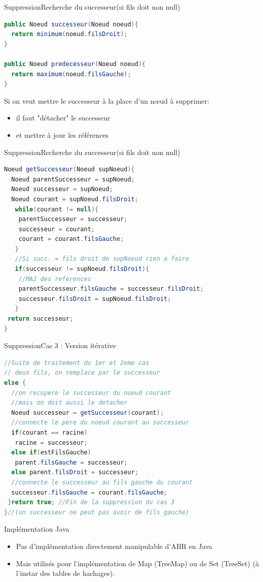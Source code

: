 \documentclass[12pt,a4paper]{beamer}
\newcommand{\hl}[1]{\textcolor{blueemph}{#1}}
\begin{document}
\begin{frame}[fragile]{Suppression}{Recherche du successeur(si fils doit non null)}

\begin{lstlisting}[language=Java]
public Noeud successeur(Noeud noeud){
  return minimum(noeud.filsDroit);
}

public Noeud predecesseur(Noeud noeud){
  return maximum(noeud.filsGauche);
}
\end{lstlisting}
Si on veut mettre le successeur à la place d'un n\oe ud à supprimer:
\begin{itemize}
\item il faut "détacher" le successeur
\item et mettre à jour les références
\end{itemize} 
\end{frame}

\begin{frame}[fragile]{Suppression}{Recherche du successeur(si fils doit non null)}
\begin{lstlisting}[language=Java]
Noeud getSuccesseur(Noeud supNoeud){
  Noeud parentSuccesseur = supNoeud;
  Noeud successeur = supNoeud;
  Noeud courant = supNoeud.filsDroit;
   while(courant != null){
    parentSuccesseur = successeur;
    successeur = courant;
    courant = courant.filsGauche;
   }
   //Si succ. = fils droit de supNoeud rien a faire
   if(successeur != supNoeud.filsDroit){
    //MAJ des references
    parentSuccesseur.filsGauche = successeur.filsDroit;
    successeur.filsDroit = supNoeud.filsDroit;
   }
 return successeur;
}
\end{lstlisting}
\end{frame}

\begin{frame}[fragile]{Suppression}{Cas 3 : Version itérative}
\begin{lstlisting}[language=Java]
//Suite de traitement du 1er et 2eme cas
// deux fils, on remplace par le successeur
else {
  //on recupere le successeur du noeud courant
  //mais on doit aussi le detacher
  Noeud successeur = getSuccesseur(courant);
  //connecte le pere du noeud courant au successeur
  if(courant == racine)
   racine = successeur;
  else if(estFilsGauche)
   parent.filsGauche = successeur;
  else parent.filsDroit = successeur;
  //connecte le successeur au fils gauche du courant
  successeur.filsGauche = courant.filsGauche;
 }return true; //Fin de la suppression du cas 3
}//(un successeur ne peut pas avoir de fils gauche)
\end{lstlisting}
\end{frame}

\begin{frame}{Implémentation Java}
\begin{itemize}
\item Pas d'implémentation directement manipulable d'ABR en Java
\item Mais utilisés pour l'implémentation de Map (\hl{TreeMap}) ou de Set (\hl{TreeSet}) (à l'instar des tables de hachages).
\end{itemize}
\end{frame}
\end{document}
